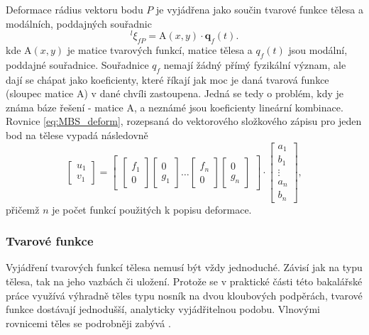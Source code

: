 Deformace rádius vektoru bodu $ P $ je vyjádřena jako součin tvarové funkce tělesa a modálních, poddajných souřadnic
\begin{equation}\label{eq:MBS_deform}
	^l\xi_{fP} = \mathrm{A}(x,y) \cdot \mathbf{q}_f(t).
\end{equation}
kde $ \mathrm{A}(x,y) $ je matice tvarových funkcí, matice tělesa a $ q_f(t) $ jsou modální, poddajné souřadnice. Souřadnice $ q_f $ nemají žádný přímý fyzikální význam, ale dají se chápat jako koeficienty, které říkají jak moc je daná tvarová funkce (sloupec matice $ \mathrm{A} $) v dané chvíli zastoupena. Jedná se tedy o problém, kdy je známa báze řešení - matice $ \mathrm{A} $, a neznámé jsou koeficienty lineární kombinace. Rovnice \ref{eq:MBS_deform}, rozepsaná do vektorového složkového zápisu pro jeden bod na tělese vypadá následovně
\begin{equation}\label{eq:MBS_deform_vekt}
	\begin{bmatrix}
		u_1 \\
		v_1
	\end{bmatrix}
	=
	\begin{bmatrix}
		\begin{bmatrix}
			f_1 \\ 0 
		\end{bmatrix}
		\begin{bmatrix}
			0 \\ g_1 
		\end{bmatrix}
		\dots
		\begin{bmatrix}
			f_n \\ 0 
		\end{bmatrix}
		\begin{bmatrix}
			0 \\ g_n 
		\end{bmatrix}
	\end{bmatrix}
	\cdot
	\begin{bmatrix}
		a_1 \\ b_1 \\ \vdots \\ a_n \\ b_n
	\end{bmatrix},
\end{equation}
přičemž $ n $ je počet funkcí použitých k popisu deformace.

\subsubsection{Tvarové funkce}
Vyjádření tvarových funkcí tělesa nemusí být vždy jednoduché. Závisí jak na typu tělesa, tak na jeho vazbách či uložení. Protože se v praktické části této bakalářské práce využívá výhradně těles typu nosník na dvou kloubových podpěrách, tvarové funkce dostávají jednodušší, analyticky vyjádřitelnou podobu. Vlnovými rovnicemi těles se podrobněji zabývá \cite{cite:Vlny}.

